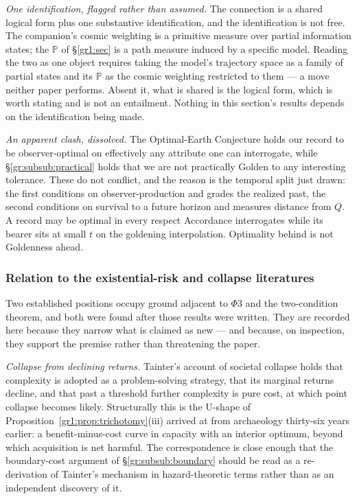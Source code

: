 \documentclass[11pt]{article}
\numberwithin{equation}{section}
\theoremstyle{plain}
\theoremstyle{definition}
\theoremstyle{remark}
\newcommand{\PP}{\mathbb{P}}
\begin{document}
\emph{One identification, flagged rather than assumed.} The connection
is a shared logical form plus one substantive identification, and the
identification is not free. The companion's cosmic weighting is a
primitive measure over partial information states; the $\PP$ of
\S\ref{gr1:sec} is a path measure induced by a
specific model. Reading the two as one object requires taking the
model's trajectory space as a family of partial states and its $\PP$ as
the cosmic weighting restricted to them --- a move neither paper
performs. Absent it, what is shared is the logical form, which is worth
stating and is not an entailment. Nothing in this section's results
depends on the identification being made.

\emph{An apparent clash, dissolved.} The Optimal-Earth Conjecture
\cite{Ben26Optimal} holds our record to be observer-optimal on
effectively any attribute one can interrogate, while \S\ref{gr:subsub:practical} holds
that we are not practically Golden to any interesting tolerance. These
do not conflict, and the reason is the temporal split just drawn: the
first conditions on observer-production and grades the realized past,
the second conditions on survival to a future horizon and measures
distance from $Q$. A record may be optimal in every respect Accordance
interrogates while its bearer sits at small $t$ on the goldening
interpolation. Optimality behind is not Goldenness ahead.

\subsubsection{Relation to the existential-risk and collapse
literatures}\label{gr:subsub:xrisk}

Two established positions occupy ground adjacent to $\Phi3$ and the
two-condition theorem, and both were found after those results were
written. They are recorded here because they narrow what is claimed as
new --- and because, on inspection, they support the premise rather than
threatening the paper.

\emph{Collapse from declining returns.} Tainter's account of societal
collapse \cite{Tainter88} holds that complexity is adopted as a
problem-solving strategy, that its marginal returns decline, and that
past a threshold further complexity is pure cost, at which point
collapse becomes likely. Structurally this is the U-shape of
Proposition~\ref{gr1:prop:trichotomy}(iii) arrived at from archaeology
thirty-six years earlier: a benefit-minus-cost curve in capacity with an
interior optimum, beyond which acquisition is net harmful. The
correspondence is close enough that the boundary-cost argument of
\S\ref{gr:subsub:boundary} should be read as a re-derivation of
Tainter's mechanism in hazard-theoretic terms rather than as an
independent discovery of it.
\end{document}
